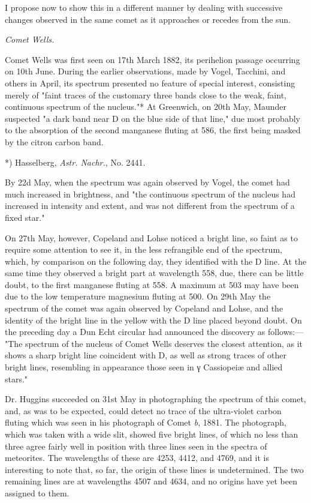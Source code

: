 \documentclass[a4paper, 12pt, oneside, polutonikogreek, english]{article}
\begin{document}
I propose now to show this in a different manner by dealing with successive changes observed in the same comet as it approaches or recedes from the sun.

\emph{Comet Wells.}

Comet Wells was first seen on 17th March 1882, its perihelion passage occurring on 10th June. During the earlier observations, made by Vogel, Tacchini, and others in April, its spectrum presented no feature of special interest, consisting merely of "faint traces of the customary three bands close to the weak, faint, continuous spectrum of the nucleus."* At Greenwich, on 20th May, Maunder suspected "a dark band near D on the blue side of that line," due most probably to the absorption of the second manganese fluting at 586, the first being masked by the citron carbon band.

*) Hasselberg, \emph{Astr. Nachr.}, No. 2441.

By 22d May, when the spectrum was again observed by Vogel, the comet had much increased in brightness, and "the continuous spectrum of the nucleus had increased in intensity and extent, and was not different from the spectrum of a fixed star."

On 27th May, however, Copeland and Lohse noticed a bright line, so faint as to require some attention to see it, in the less refrangible end of the spectrum, which, by comparison on the following day, they identified with the D line. At the same time they observed a bright part at wavelength 558, due, there can be little doubt, to the first manganese fluting at 558. A maximum at 503 may have been due to the low temperature magnesium fluting at 500. On 29th May the spectrum of the comet was again observed by Copeland and Lohse, and the identity of the bright line in the yellow with the D line placed beyond doubt. On the preceding day a Dun Echt circular had announced the discovery as follows:--- "The spectrum of the nucleus of Comet Wells deserves the closest attention, as it shows a sharp bright line coincident with D, as well as strong traces of other bright lines, resembling in appearance those seen in γ Cassiopeiæ and allied stars."

Dr. Huggins succeeded on 31st May in photographing the spectrum of this comet, and, as was to be expected, could detect no trace of the ultra-violet carbon fluting which was seen in his photograph of Comet \emph{b}, 1881. The photograph, which was taken with a wide slit, showed five bright lines, of which no less than three agree fairly well in position with three lines seen in the spectra of meteorites. The wavelengths of these are 4253, 4412, and 4769, and it is interesting to note that, so far, the origin of these lines is undetermined. The two remaining lines are at wavelengths 4507 and 4634, and no origins have yet been assigned to them.
\end{document}
